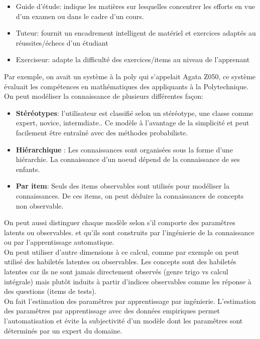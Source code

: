 \documentclass[oneside]{book}
\begin{document}
\begin{itemize}
\item Guide d'étude: indique les matières sur lesquelles concentrer les efforts en vue d'un examen ou dans le cadre d'un cours. 
\item Tuteur: fournit un encadrement intelligent de matériel et exercices adaptés au réussites/échecs d'un étudiant
\item Exerciseur: adapte la difficulté des exercices/items au niveau de l'apprenant
\end{itemize}

Par exemple, on avait un système à la poly qui s'appelait Agata Z050, ce système évaluait les compétences en mathématiques des appliquants à la Polytechnique.\\

On peut modéliser la connaissance de plusieurs différentes façon:\\
\begin{itemize}
\item \textbf{Stéréotypes}: l'utilisateur est classifié selon un stéréotype, une classe comme expert, novice, intermdiate.. Ce modèle à l'avantage de la simplicité et peut facilement être entraîné avec des méthodes probabiliste.
\item \textbf{Hiérarchique} : Les connaissances sont organisées sous la forme d'une hiérarchie. La connaissance d'un noeud dépend de la connaissance de ses enfants.
\item \textbf{Par item}: Seuls des items observables sont utilisés pour modéliser la connaissances. De ces items, on peut déduire la connaissances de concepts non observable.
\end{itemize}

On peut aussi distinguer chaque modèle selon s'il comporte des paramêtres latents ou observables. et qu'ils sont construits par l'ingénierie de la connaissance ou par l'apprentissage automatique.\\

On peut utiliser d'autre dimensions à ce calcul, comme par exemple on peut utilisé des habiletés latentes ou observables. Les concepts sont des habiletés latentes car ils ne sont jamais directement observés (genre trigo vs calcul intégrale) mais plutôt induits à partir d'indices observables comme les réponse à des questions (items de tests).\\

On fait l'estimation des paramêtres par apprentissage par ingénierie. L'estimation des paramêtres par apprentissage avec des données empiriques permet l'automatisation et évite la subjectivité d'un modèle dont les paramêtres sont déterminés par un expert du domaine.\\
\end{document}
